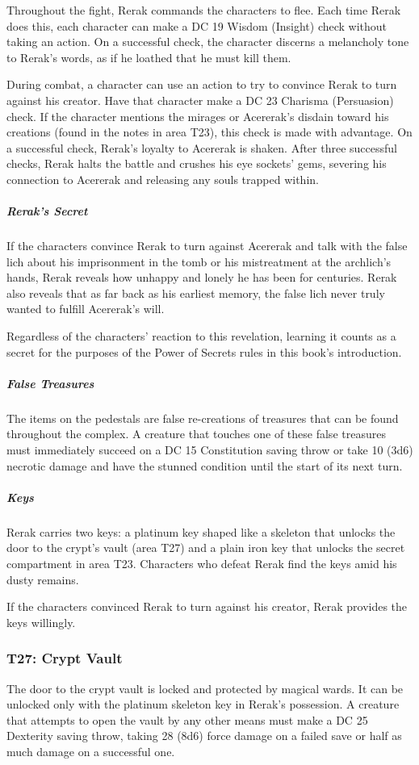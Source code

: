 \documentclass[10pt,a4paper,twoside,bg=print,twocolumn,openany,nodeprecatedcode]{dndbook}
\begin{document}
Throughout the fight, Rerak commands the characters to flee. Each time Rerak does this, each character can make a DC 19 Wisdom (Insight) check without taking an action. On a successful check, the character discerns a melancholy tone to Rerak's words, as if he loathed that he must kill them.

During combat, a character can use an action to try to convince Rerak to turn against his creator. Have that character make a DC 23 Charisma (Persuasion) check. If the character mentions the mirages or Acererak's disdain toward his creations (found in the notes in area T23), this check is made with advantage. On a successful check, Rerak's loyalty to Acererak is shaken. After three successful checks, Rerak halts the battle and crushes his eye sockets' gems, severing his connection to Acererak and releasing any souls trapped within.

\subparagraph{Rerak's Secret}
If the characters convince Rerak to turn against Acererak and talk with the false lich about his imprisonment in the tomb or his mistreatment at the archlich's hands, Rerak reveals how unhappy and lonely he has been for centuries. Rerak also reveals that as far back as his earliest memory, the false lich never truly wanted to fulfill Acererak's will.

Regardless of the characters' reaction to this revelation, learning it counts as a secret for the purposes of the Power of Secrets rules in this book's introduction.

\subparagraph{False Treasures}
The items on the pedestals are false re-creations of treasures that can be found throughout the complex. A creature that touches one of these false treasures must immediately succeed on a DC 15 Constitution saving throw or take 10 (3d6) necrotic damage and have the stunned condition until the start of its next turn.

\subparagraph{Keys}
Rerak carries two keys: a platinum key shaped like a skeleton that unlocks the door to the crypt's vault (area T27) and a plain iron key that unlocks the secret compartment in area T23. Characters who defeat Rerak find the keys amid his dusty remains.

If the characters convinced Rerak to turn against his creator, Rerak provides the keys willingly.

\subsubsection{T27: Crypt Vault}
The door to the crypt vault is locked and protected by magical wards. It can be unlocked only with the platinum skeleton key in Rerak's possession. A creature that attempts to open the vault by any other means must make a DC 25 Dexterity saving throw, taking 28 (8d6) force damage on a failed save or half as much damage on a successful one.
\end{document}
